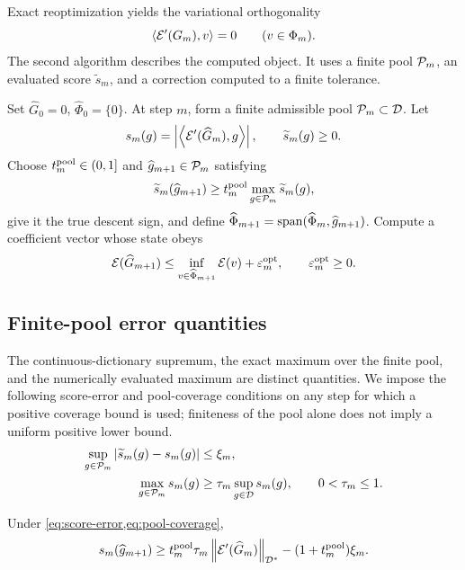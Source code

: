 Exact reoptimization yields the variational orthogonality
\begin{equation}
 \left\langle \mathcal{E}'(G_m),v\right\rangle=0\qquad(v\in\Phi_m).
 \label{eq:orthogonality}
\end{equation}
The second algorithm describes the computed object. It uses a finite pool \(\mathcal{P}_m\), an evaluated
score \(\widetilde s_m\), and a correction computed to a finite tolerance.

\begin{algorithm}
\label{alg:finite}
Set \(\widehat G_0=0\), \(\widehat\Phi_0=\{0\}\). At step \(m\), form a finite admissible pool
\(\mathcal{P}_m\subset\mathcal{D}\). Let
\[
 s_m(g)=\left\lvert \left\langle \mathcal{E}'(\widehat G_m),g\right\rangle\right\rvert,
 \qquad \widetilde s_m(g)\geq0.
\]
Choose \(t_m^{\rm pool}\in(0,1]\) and \(\widehat g_{m+1}\in\mathcal{P}_m\) satisfying
\[
 \widetilde s_m(\widehat g_{m+1})
 \geq t_m^{\rm pool}\max_{g\in\mathcal{P}_m}\widetilde s_m(g),
\]
give it the true descent sign, and define
\(\widehat\Phi_{m+1}=\operatorname{span}(\widehat\Phi_m,\widehat g_{m+1})\). Compute a coefficient vector whose state
obeys
\[
 \mathcal{E}(\widehat G_{m+1})
 \leq\inf_{v\in\widehat\Phi_{m+1}}\mathcal{E}(v)+\varepsilon_m^{\rm opt},
 \qquad \varepsilon_m^{\rm opt}\geq0.
\]
\end{algorithm}

\subsection{Finite-pool error quantities}
\label{sec:controlled-selection}

The continuous-dictionary supremum, the exact maximum over the finite pool, and the
numerically evaluated maximum are distinct quantities. We impose the following
score-error and pool-coverage conditions on any step for which a positive coverage
bound is used; finiteness of the pool alone does not imply a uniform positive lower bound.
\begin{align}
 \sup_{g\in\mathcal{P}_m}\left\lvert \widetilde s_m(g)-s_m(g)\right\rvert&\leq\xi_m,
 \label{eq:score-error}\\
 \max_{g\in\mathcal{P}_m}s_m(g)&\geq
 \tau_m\sup_{g\in\mathcal{D}}s_m(g),\qquad0<\tau_m\leq1.
 \label{eq:pool-coverage}
\end{align}

\begin{lemma}
\label{lem:true-score}
Under \cref{eq:score-error,eq:pool-coverage},
\begin{equation}
 s_m(\widehat g_{m+1})\geq
 t_m^{\rm pool}\tau_m\left\lVert \mathcal{E}'(\widehat G_m)\right\rVert_{\mathcal{D}^*}
 -(1+t_m^{\rm pool})\xi_m.
\label{eq:true-score-lower}
\end{equation}
\end{lemma}

